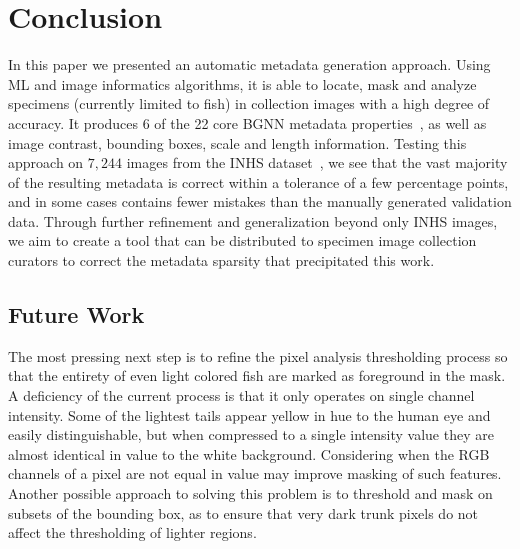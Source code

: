 \documentclass[conference]{IEEEtran}
\begin{document}
\section{Conclusion}
In this paper we presented an automatic metadata generation approach. 
Using ML and image informatics algorithms, it is able to locate, mask and analyze specimens (currently limited to fish) in collection images with a high degree of accuracy. It produces 6 of the 22 core BGNN metadata properties~\cite{leipzig2021biodiversity}, as well as image contrast, bounding boxes, scale and length information. Testing this approach on \(7,244\) images from the INHS dataset~\cite{INHS}, we see that the vast majority of the resulting metadata is correct within a tolerance of a few percentage points, and in some cases contains fewer mistakes than the manually generated validation data. Through further refinement and generalization beyond only INHS images, we aim to create a tool that can be distributed to specimen image collection curators to correct the metadata sparsity that precipitated this work.
\subsection{Future Work}
The most pressing next step is to refine the pixel analysis thresholding process so that the entirety of even light colored fish are marked as foreground in the mask. A deficiency of the current process is that it only operates on single channel intensity. Some of the lightest tails appear yellow in hue to the human eye and easily distinguishable, but when compressed to a single intensity value they are almost identical in value to the white background. Considering when the RGB channels of a pixel are not equal in value may improve masking of such features. Another possible approach to solving this
problem is to threshold and mask on subsets of the bounding box, as to ensure that very dark trunk pixels do not affect the thresholding of lighter regions.
\end{document}
